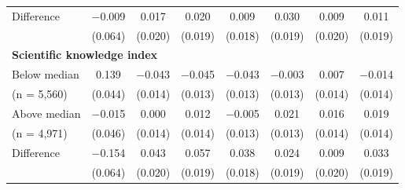 \begin{tabular}[t]{lccccccc}
\hspace{1em}  Difference & \num{-0.009} & \num{0.017} & \num{0.020} & \num{0.009} & \num{0.030} & \num{0.009} & \num{0.011}\\
\hspace{2em} & (\num{0.064}) & (\num{0.020}) & (\num{0.019}) & (\num{0.018}) & (\num{0.019}) & (\num{0.020}) & (\num{0.019})\\\multicolumn{4}{l}{\textbf{Scientific knowledge index}} \rule{0pt}{1.2\normalbaselineskip}\\
\hspace{1em} Below median & \num{0.139} & \num{-0.043} & \num{-0.045} & \num{-0.043} & \num{-0.003} & \num{0.007} & \num{-0.014}\\
\hspace{2em}(n = 5,560) & (\num{0.044}) & (\num{0.014}) & (\num{0.013}) & (\num{0.013}) & (\num{0.013}) & (\num{0.014}) & (\num{0.014})\\
\hspace{1em} Above median & \num{-0.015} & \num{0.000} & \num{0.012} & \num{-0.005} & \num{0.021} & \num{0.016} & \num{0.019}\\
\hspace{2em}(n = 4,971) & (\num{0.046}) & (\num{0.014}) & (\num{0.014}) & (\num{0.013}) & (\num{0.013}) & (\num{0.014}) & (\num{0.014})\\\cmidrule(lr){2-8}
\hspace{1em} Difference & \num{-0.154} & \num{0.043} & \num{0.057} & \num{0.038} & \num{0.024} & \num{0.009} & \num{0.033}\\
\hspace{2em} & (\num{0.064}) & (\num{0.020}) & (\num{0.019}) & (\num{0.018}) & (\num{0.019}) & (\num{0.020}) & (\num{0.019})\\
\end{tabular}
